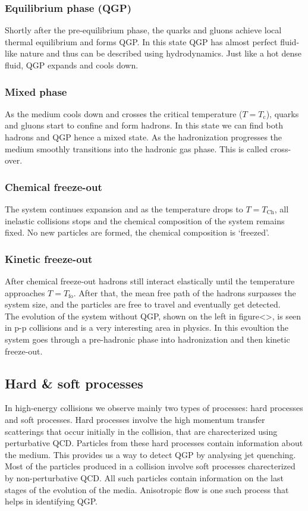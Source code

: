 \documentclass[12pt,a4paper,twoside]{report}
\begin{document}
\subsubsection{Equilibrium phase (QGP)}
Shortly after the pre-equilibrium phase, the quarks and gluons achieve local thermal equilibrium and forms QGP. In this state QGP has almost perfect fluid-like nature and thus can be described using hydrodynamics. Just like a hot dense fluid, QGP expands and cools down.
\subsubsection{Mixed phase}
As the medium cools down and crosses the critical temperature  ($T=T_\mathrm{c}$), quarks and gluons start to confine and form hadrons. In this state we can find both hadrons and QGP hence a mixed state. As the hadronization progresses the medium smoothly transitions into the hadronic gas phase. This is called cross-over.
\subsubsection{Chemical freeze-out}
The system continues expansion and as the temperature drops to $T=T_\mathrm{Ch}$, all inelastic collisions stops and the chemical composition of the system remains fixed. No new particles are formed, the chemical composition is `freezed'.
\subsubsection{Kinetic freeze-out}
After chemical freeze-out hadrons still interact elastically until the temperature approaches $T=T_\mathrm{fo}$. After that, the mean free path of the hadrons surpasses the system size, and the particles are free to travel and eventually get detected.\\

The evolution of the system without QGP, shown on the left in figure<>, is seen in p-p collisions and is a very interesting area in physics. In this evoultion the system goes through a pre-hadronic phase into hadronization and then kinetic freeze-out.
\subsection{Hard \& soft processes}
In high-energy collisions we observe mainly two types of processes: hard processes and soft processes. Hard processes involve the high momentum transfer scatterings that occur initially in the collision, that are charecterized using perturbative QCD. Particles from these hard processes contain information about the medium. This provides us a way to detect QGP by analysing jet quenching. Most of the particles produced in a collision involve soft processes charecterized by non-perturbative QCD. All such particles contain information on the last stages of the evolution of the media. Anisotropic flow is one such process that helps in identifying QGP.
\end{document}

